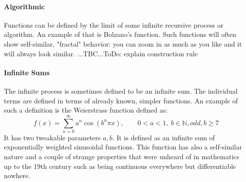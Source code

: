 \paragraph{Algorithmic}
Functions can be defined by the limit of some infinite recursive process or algorithm. An example of that is Bolzano's function. Such functions will often show self-similar, "fractal" behavior: you can zoom in as much as you like and it will always look similar. 
...TBC...ToDo: explain construction rule

\paragraph{Infinite Sums}
The infinite process is sometimes defined to be an infinite sum. The individual terms are defined in terms of already known, simpler functions. An example of such a definition is the Weierstrass function defined as:
\begin{equation}
f(x) = \sum_{n=0}^\infty a^n \cos(b^n \pi x), 
\qquad 0 < a < 1, \; b \in \mathbb{N}, odd, b \geq 7
\end{equation}
It has two tweakable parameters $a,b$. It is defined as an infinite sum of exponentially weighted sinusoidal functions. This function has also a self-similar nature and a couple of strange properties that were unheard of in mathematics up to the 19th century such as being continuous everywhere but differentiable nowhere.

